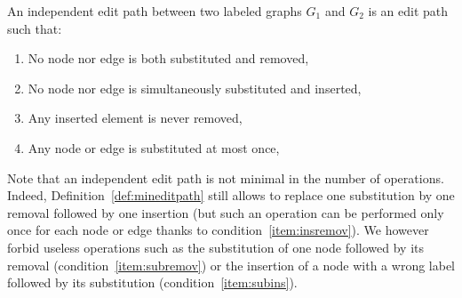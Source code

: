 \begin{definition}
  \label{def:mineditpath}
  An independent edit path between two labeled graphs $G_1$ and $G_2$ is
  an edit path such that:
  \begin{enumerate}
  \item\label{item:subremov} No node nor edge is both substituted and
    removed,
  \item\label{item:subins} No node nor edge is simultaneously substituted and inserted,
  \item\label{item:insremov} Any inserted element is never removed,
  \item\label{intem:subsonce} Any node or edge is substituted at most
    once,
  \end{enumerate}    
\end{definition}
Note that an independent edit path is not minimal in the number of
operations. Indeed, Definition~\ref{def:mineditpath} still allows to
replace one substitution by one removal followed by one insertion
(but such an operation can be performed only once for each node or
edge thanks to condition~\ref{item:insremov}).  We however forbid useless
operations such as the substitution of one node followed by its
removal (condition~\ref{item:subremov}) or the insertion of a node
with a wrong label followed by its substitution
(condition~\ref{item:subins}).

